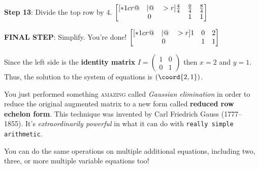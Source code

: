 \documentclass[12pt,tiks]{article}
\newcommand{\icol}[1]{%
  \left(\begin{smallmatrix}#1\end{smallmatrix}\right)%
}
\begin{document}
    \hspace{.1in}\vspace{.5in}
    
    \begin{minipage}[t][.7in][t]{3in}\RaggedRight
    \-\vspace*{.1in}
    \textbf{Step 13}: Divide the top row by $4$.
        $
            \begin{bmatrix}[*1cr@{\quad}|@{\quad}>{\color{black}}r]
              \frac{4}{4} & \frac{0}{4} & \frac{8}{4} \\
              0 & 1 & 1
            \end{bmatrix}
        $
    \end{minipage}
    \hspace{.1in}
    \begin{minipage}[t][.7in][t]{3in}\RaggedRight
    \-\vspace*{.1in}
    \textbf{FINAL STEP}: Simplify. You're done!
        $
            \begin{bmatrix}[*1cr@{\quad}|@{\quad}>{\color{black}}r]
              1 & 0 & 2 \\
              0 & 1 & 1
            \end{bmatrix}
        $
    \end{minipage}
    
    \hspace{.1in}\vspace{.3in}
    
    Since the left side is the \textbf{identity matrix} ${I}=\icol{1 & 0 \\ 0 & 1}$ then $x=2$ and $y=1$. Thus, the solution to the system of equations is $(\coord{2,1})$.
    
    \par\vspace{.1in}
    You just performed something \textsc{amazing} called \textit{Gaussian elimination} in order to reduce the original augmented matrix to a new form called \textbf{reduced row echelon form}. This technique was invented by Carl Friedrich Gauss (1777–1855). It's \textit{extraordinarily powerful} in what it can do with \texttt{really simple arithmetic}. 
    
    \newpage
    \clearpage
    \thispagestyle{fancy}
    
    You can do the same operations on multiple additional equations, including two, three, or more multiple variable equations too!
    
    \hspace{.1in}\vspace{.05in}
    
\end{document}
